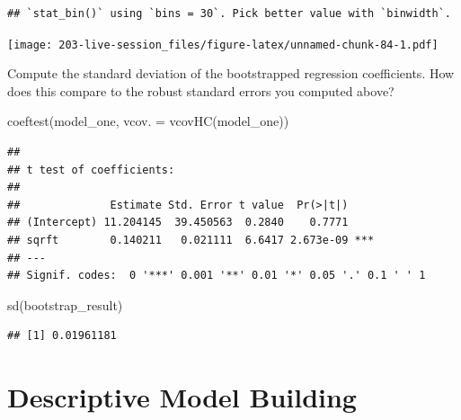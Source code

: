 \documentclass[
]{book}
\newenvironment{Shaded}{\begin{snugshade}}{\end{snugshade}}
\newcommand{\AttributeTok}[1]{\textcolor[rgb]{0.77,0.63,0.00}{#1}}
\newcommand{\FunctionTok}[1]{\textcolor[rgb]{0.00,0.00,0.00}{#1}}
\newcommand{\NormalTok}[1]{#1}
\theoremstyle{definition}
\theoremstyle{definition}
\theoremstyle{definition}
\theoremstyle{definition}
\theoremstyle{remark}
\begin{document}
\begin{verbatim}
## `stat_bin()` using `bins = 30`. Pick better value with `binwidth`.
\end{verbatim}

\texttt{[image: 203-live-session\_files/figure-latex/unnamed-chunk-84-1.pdf]}

Compute the standard deviation of the bootstrapped regression coefficients. How does this compare to the robust standard errors you computed above?

\begin{Shaded}
\begin{Highlighting}[]
\FunctionTok{coeftest}\NormalTok{(model\_one, }\AttributeTok{vcov. =} \FunctionTok{vcovHC}\NormalTok{(model\_one))}
\end{Highlighting}
\end{Shaded}

\begin{verbatim}
## 
## t test of coefficients:
## 
##              Estimate Std. Error t value  Pr(>|t|)    
## (Intercept) 11.204145  39.450563  0.2840    0.7771    
## sqrft        0.140211   0.021111  6.6417 2.673e-09 ***
## ---
## Signif. codes:  0 '***' 0.001 '**' 0.01 '*' 0.05 '.' 0.1 ' ' 1
\end{verbatim}

\begin{Shaded}
\begin{Highlighting}[]
\FunctionTok{sd}\NormalTok{(bootstrap\_result)}
\end{Highlighting}
\end{Shaded}

\begin{verbatim}
## [1] 0.01961181
\end{verbatim}

\hypertarget{descriptive-model-building}{%
\chapter{Descriptive Model Building}\label{descriptive-model-building}}
\end{document}
